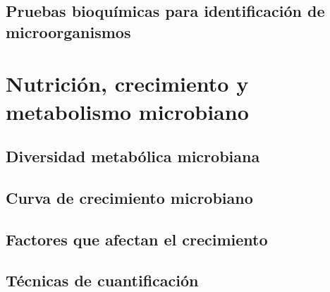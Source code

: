 \documentclass{AsignaturaResumen}
\begin{document}
    \chapter{Pruebas bioquímicas para identificación de microorganismos}

\part{Nutrición, crecimiento y metabolismo microbiano}
    \chapter{Diversidad metabólica microbiana}
    \chapter{Curva de crecimiento microbiano}
    \chapter{Factores que afectan el crecimiento}
    \chapter{Técnicas de cuantificación}


    \backmatter



    \appendix
    
    
\end{document}
